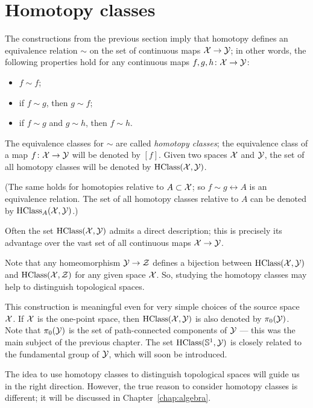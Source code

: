 \section{Homotopy classes}

The constructions from the previous section imply that homotopy defines an equivalence relation $\sim$ on the set of continuous maps $\mathcal{X}\to\mathcal{Y}$; in other words, the following properties hold for any continuous maps $f,g,h\colon \mathcal{X}\to\mathcal{Y}$:
\begin{itemize}
 \item $f\sim f$;
 \item if $f\sim g$, then $g\sim f$;
 \item if $f\sim g$ and $g\sim h$, then $f\sim h$.
\end{itemize}


The equivalence classes for $\sim$ are called \emph{homotopy classes};
the equivalence class of a map $f\colon\mathcal{X}\to\mathcal{Y}$ will be denoted by $[f]$.
Given two spaces $\mathcal{X}$ and $\mathcal{Y}$, the set of all homotopy classes will be denoted by
$\mathrm{HClass}(\mathcal{X},\mathcal{Y})$.

(The same holds for homotopies relative to $A\subset \mathcal{X}$; so $f\sim g \rel A$ is an equivalence relation.
The set of all homotopy classes relative to $A$ can be denoted by $\mathrm{HClass}_A(\mathcal{X},\mathcal{Y})$.)

Often the set $\mathrm{HClass}(\mathcal{X},\mathcal{Y})$ admits a direct description; this is precisely its advantage over the vast set of all continuous maps $\mathcal{X}\to \mathcal{Y}$.

Note that any homeomorphism $\mathcal{Y}\to \mathcal{Z}$ defines a bijection between $\mathrm{HClass}(\mathcal{X},\mathcal{Y})$ and $\mathrm{HClass}(\mathcal{X},\mathcal{Z})$ for any given space $\mathcal{X}$.
So, studying the homotopy classes may help to distinguish topological spaces.

This construction is meaningful even for very simple choices of the source space $\mathcal{X}$.
If $\mathcal{X}$ is the one-point space, then $\mathrm{HClass}(\mathcal{X},\mathcal{Y})$ is also denoted by $\pi_0(\mathcal{Y})$.
Note that $\pi_0(\mathcal{Y})$ is the set of path-connected components of $\mathcal{Y}$ --- this was the main subject of the previous chapter.
The set $\mathrm{HClass}(\mathbb{S}^1,\mathcal{Y})$ is closely related to the fundamental group of $\mathcal{Y}$, which will soon be introduced.

The idea to use homotopy classes to distinguish topological spaces will guide us in the right direction.
However, the true reason to consider homotopy classes is different; it will be discussed in Chapter~\ref{chap:algebra}.


